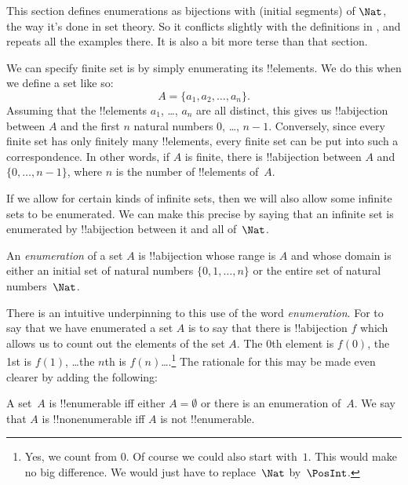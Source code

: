\documentclass[../../../include/open-logic-section]{subfiles}
\begin{document}


\begin{editorial}
  This section defines enumerations as bijections with (initial
  segments) of $\Nat$, the way it's done in set theory. So it
  conflicts slightly with the definitions in , and
  repeats all the examples there. It is also a bit more terse than
  that section.
\end{editorial}

We can specify finite set is by simply enumerating its
!!{element}s. We do this when we define a set like so:
\[
  A = \{a_1, a_2, \ldots, a_n\}.
\]
Assuming that the !!{element}s $a_1$, \dots, $a_n$ are all distinct,
this gives us !!a{bijection} between $A$ and the first $n$ natural
numbers $0$, \dots, $n-1$. Conversely, since every finite set has only
finitely many !!{element}s, every finite set can be put into such a
correspondence. In other words, if $A$ is finite, there is
!!a{bijection} between $A$ and $\{0, \dots, n-1\}$, where $n$ is the
number of !!{element}s of~$A$.

If we allow for certain kinds of infinite sets, then we will also
allow some infinite sets to be enumerated. We can make this precise by
saying that an infinite set is enumerated by !!a{bijection} between it
and all of~$\Nat$.

\begin{defn} 
An \emph{enumeration} of a set $A$ is !!a{bijection} whose range is
$A$ and whose domain is either an initial set of natural numbers $\{0,
1, \ldots, n\}$ {or} the entire set of natural numbers~$\Nat$. 
\end{defn}

\begin{explain}
There is an intuitive underpinning to this use of the word
\emph{enumeration}. For to say that we have enumerated a set $A$ is to
say that there is !!a{bijection} $f$ which allows us to count out the
elements of the set $A$. The $0$th element is $f(0)$, the 1st is
$f(1)$, \ldots the $n$th is $f(n)$\ldots.\footnote{Yes, we count
from $0$. Of course we could also start with~$1$. This would
make no big difference. We would just have to replace~$\Nat$
by~$\PosInt$.} The rationale for this may be made even clearer by
adding the following:
\end{explain}

\begin{defn}
  A set~$A$ is !!{enumerable} iff either $A = \emptyset$ or there is
  an enumeration of~$A$. We say that $A$ is !!{nonenumerable} iff $A$
  is not !!{enumerable}.
\end{defn}
\end{document}
